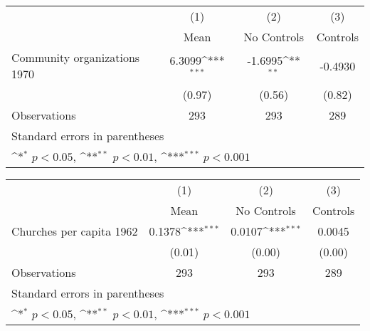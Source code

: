 {
\def\sym#1{\ifmmode^{#1}\else\(^{#1}\)\fi}
\begin{tabular}{l*{3}{c}}
\hline\hline
                    &\multicolumn{1}{c}{(1)}&\multicolumn{1}{c}{(2)}&\multicolumn{1}{c}{(3)}\\
                    &\multicolumn{1}{c}{Mean}&\multicolumn{1}{c}{No Controls}&\multicolumn{1}{c}{Controls}\\
\hline
Community organizations 1970&      6.3099\sym{***}&     -1.6995\sym{**} &     -0.4930         \\
                    &      (0.97)         &      (0.56)         &      (0.82)         \\
\hline
Observations        &         293         &         293         &         289         \\
\hline\hline
\multicolumn{4}{l}{\footnotesize Standard errors in parentheses}\\
\multicolumn{4}{l}{\footnotesize \sym{*} \(p<0.05\), \sym{**} \(p<0.01\), \sym{***} \(p<0.001\)}\\
\end{tabular}
}
{
\def\sym#1{\ifmmode^{#1}\else\(^{#1}\)\fi}
\begin{tabular}{l*{3}{c}}
\hline\hline
                    &\multicolumn{1}{c}{(1)}&\multicolumn{1}{c}{(2)}&\multicolumn{1}{c}{(3)}\\
                    &\multicolumn{1}{c}{Mean}&\multicolumn{1}{c}{No Controls}&\multicolumn{1}{c}{Controls}\\
\hline
Churches per capita 1962&      0.1378\sym{***}&      0.0107\sym{***}&      0.0045         \\
                    &      (0.01)         &      (0.00)         &      (0.00)         \\
\hline
Observations        &         293         &         293         &         289         \\
\hline\hline
\multicolumn{4}{l}{\footnotesize Standard errors in parentheses}\\
\multicolumn{4}{l}{\footnotesize \sym{*} \(p<0.05\), \sym{**} \(p<0.01\), \sym{***} \(p<0.001\)}\\
\end{tabular}
}
